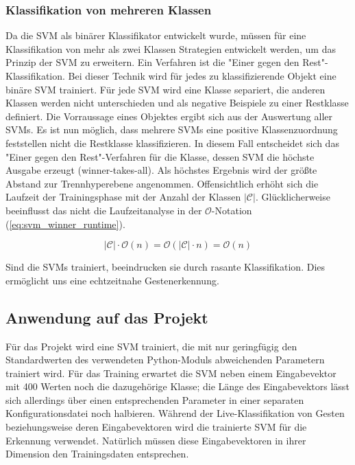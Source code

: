 \newpage

\subsubsection{Klassifikation von mehreren Klassen}

Da die SVM als binärer Klassifikator entwickelt wurde, müssen für eine Klassifikation von mehr als zwei Klassen Strategien entwickelt werden, um das Prinzip der SVM zu erweitern. 
Ein Verfahren ist die "{}Einer gegen den Rest"{}-Klassifikation. 
Bei dieser Technik wird für jedes zu klassifizierende Objekt eine binäre SVM trainiert. 
Für jede SVM wird eine Klasse separiert, die anderen Klassen werden nicht unterschieden und als negative Beispiele zu einer Restklasse definiert. 
Die Vorraussage eines Objektes ergibt sich aus der Auswertung aller SVMs. 
Es ist nun möglich, dass mehrere SVMs eine positive Klassenzuordnung feststellen nicht die Restklasse klassifizieren. 
In diesem Fall entscheidet sich das "{}Einer gegen den Rest"{}-Verfahren für die Klasse, dessen SVM die höchste Ausgabe erzeugt (winner-takes-all). 
Als höchstes Ergebnis wird der größte Abstand zur Trennhyperebene angenommen. 
Offensichtlich erhöht sich die Laufzeit der Trainingsphase mit der Anzahl der Klassen $|\mathcal{C}|$. 
Glücklicherweise beeinflusst das nicht die Laufzeitanalyse in der $\mathcal{O}$-Notation (\ref{eq:svm_winner_runtime}). 

\begin{equation}
\label{eq:svm_winner_runtime}
    |\mathcal{C}| \cdot \mathcal{O}(n) = \mathcal{O}(|\mathcal{C}| \cdot n) =  \mathcal{O}(n)
\end{equation}

Sind die SVMs trainiert, beeindrucken sie durch rasante Klassifikation. 
Dies ermöglicht uns eine echtzeitnahe Gestenerkennung.



\newpage 
\subsection{Anwendung auf das Projekt}
Für das Projekt wird eine \ac{SVM} trainiert, die mit nur geringfügig den Standardwerten des verwendeten Python-Moduls abweichenden Parametern trainiert wird. 
Für das Training erwartet die \ac{SVM} neben einem Eingabevektor mit 400 Werten noch die dazugehörige Klasse; die Länge des Eingabevektors lässt sich allerdings über einen entsprechenden Parameter in einer separaten Konfigurationsdatei noch halbieren.
Während der Live-Klassifikation von Gesten beziehungsweise deren Eingabevektoren wird die trainierte \ac{SVM} für die Erkennung verwendet.
Natürlich müssen diese Eingabevektoren in ihrer Dimension den Trainingsdaten entsprechen.

